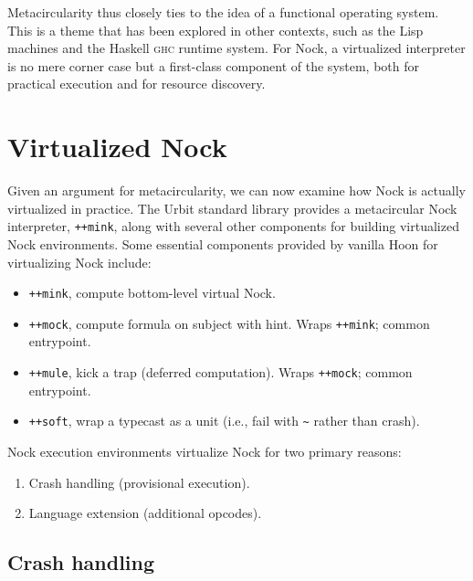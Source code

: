 \documentclass[twoside]{article}
\begin{document}
\noindent
Metacircularity thus closely ties to the idea of a functional operating system.  This is a theme that has been explored in other contexts, such as the Lisp machines and the Haskell \textsc{ghc} runtime system.  For Nock, a virtualized interpreter is no mere corner case but a first-class component of the system, both for practical execution and for resource discovery.


\section{Virtualized Nock}

Given an argument for metacircularity, we can now examine how Nock is actually virtualized in practice.  The Urbit standard library provides a metacircular Nock interpreter, \lstinline[style=inlinecode]{++mink}, along with several other components for building virtualized Nock environments.  Some essential components provided by vanilla Hoon for virtualizing Nock include:

\begin{itemize}
  \item  \lstinline[style=inlinecode]{++mink}, compute bottom-level virtual Nock.
  \item  \lstinline[style=inlinecode]{++mock}, compute formula on subject with hint.  Wraps \lstinline[style=inlinecode]{++mink}; common entrypoint.
  \item  \sloppy \lstinline[style=inlinecode]{++mule}, kick a trap (deferred computation).  Wraps \lstinline[style=inlinecode]{++mock}; common entrypoint.
  \item  \lstinline[style=inlinecode]{++soft}, wrap a typecast as a unit (i.e., fail with \lstinline[style=inlinecode]{~} rather than crash).
\end{itemize}

\noindent


Nock execution environments virtualize Nock for two primary reasons:

\begin{enumerate}
  \item  Crash handling (provisional execution).
  \item  Language extension (additional opcodes).
\end{enumerate}

\subsection{Crash handling}
\end{document}
